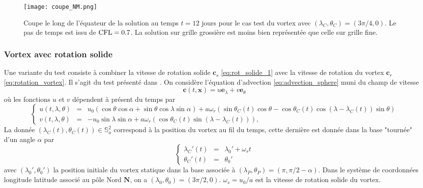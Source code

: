 \begin{figure}[htbp]
\begin{center}
\texttt{[image: coupe\_NM.png]}
\end{center}
\caption{Coupe le long de l'équateur de la solution au temps $t=12$ jours pour le cas test du vortex \cite{Nair2002} avec $(\lambda_C, \theta_C) = (3 \pi / 4,0)$. Le pas de temps est issu de $\text{CFL} = 0.7$. La solution sur grille grossière est moins bien représentée que celle sur grille fine.}
\label{fig:coupe_NM}
\end{figure}









\subsubsection{Vortex avec rotation solide}

Une variante du test \cite{Nair2002} consiste à combiner la vitesse de rotation solide $\mathbf{c}_s$ \eqref{eq:rot_solide_1} avec la vitesse de rotation du vortex $\mathbf{c}_r$ \eqref{eq:rotation_vortex}. Il s'agit du test présenté dans \cite{Nair2008}.
On considère l'équation d'advection \eqref{eq:advection_sphere} muni du champ de vitesse
\begin{equation}
\mathbf{c}(t,\mathbf{x}) = u \mathbf{e}_{\lambda} + v \mathbf{e}_{\theta}
\end{equation}
où les fonctions $u$ et $v$ dépendent à présent du temps par 
\begin{equation}
\left\lbrace
\begin{array}{rcl}
u(t,\lambda, \theta) & = & u_0 \left( \cos \theta \cos \alpha + \sin \theta \cos \lambda \sin \alpha \right) + a \omega_r \left( \sin \theta_C(t) \cos \theta - \cos \theta_C(t) \cos (\lambda - \lambda_C(t)) \sin \theta \right) \\
v(t,\lambda, \theta) & = & - u_0 \sin \lambda \sin \alpha + a \omega_r \left( \cos \theta_C(t) \sin (\lambda - \lambda_C(t)) \right),
\end{array}
\right.
\label{eq:vitesse_NJ}
\end{equation}
La donnée $(\lambda_C(t), \theta_C(t)) \in \mathbb{S}_a^2$ correspond à la position du vortex au fil du temps, cette dernière est donnée dans la base "tournée" d'un angle $\alpha$ par
\begin{equation}
\left\lbrace
\begin{array}{rcl}
\lambda_C'(t) & = & \lambda_0' + \omega_s t \\
\theta_C'(t) & = & \theta_0'
\end{array}
\right.
\end{equation}
avec $(\lambda_0', \theta_0')$ la position initiale du vortex statique dans la base associée à $(\lambda_P, \theta_P)=(\pi, \pi/2-\alpha)$. Dans le système de coordonnées longitude latitude associé au pôle Nord $\mathbf{N}$, on a $(\lambda_0,\theta_0)=(3 \pi / 2, 0)$. $\omega_s = u_0/a$ est la vitesse de rotation solide du vortex. 

